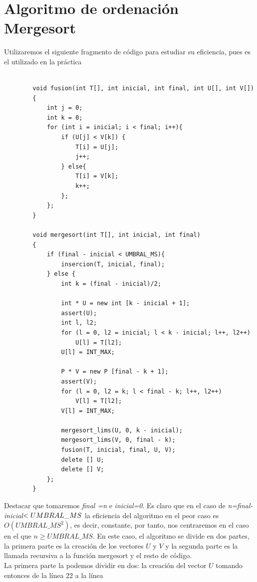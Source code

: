 \documentclass[11pt,openany]{book}
\begin{document}
        \section*{Algoritmo de ordenación Mergesort}
        Utilizaremos el siguiente fragmento de código para estudiar su eficiencia, pues es el utilizado en la práctica
        \begin{lstlisting}
  
        void fusion(int T[], int inicial, int final, int U[], int V[])
        {
            int j = 0;
            int k = 0;
            for (int i = inicial; i < final; i++){
                if (U[j] < V[k]) {
                    T[i] = U[j];
                    j++;
                } else{
                    T[i] = V[k];
                    k++;
                };
            };
        }

        void mergesort(int T[], int inicial, int final)
        {
            if (final - inicial < UMBRAL_MS){
                insercion(T, inicial, final);
            } else {
                int k = (final - inicial)/2;

                int * U = new int [k - inicial + 1];
                assert(U);
                int l, l2;
                for (l = 0, l2 = inicial; l < k - inicial; l++, l2++)
                    U[l] = T[l2];
                U[l] = INT_MAX;

                P * V = new P [final - k + 1];
                assert(V);
                for (l = 0, l2 = k; l < final - k; l++, l2++)
                    V[l] = T[l2];
                V[l] = INT_MAX;

                mergesort_lims(U, 0, k - inicial);
                mergesort_lims(V, 0, final - k);
                fusion(T, inicial, final, U, V);
                delete [] U;
                delete [] V;
            };
        }
        \end{lstlisting}
        Destacar que tomaremos \textit{final =n} e \textit{inicial=0}. Es claro que en el caso de \textit{n=final-inicial}$<\nobreak UMBRAL\_MS$ 
        la eficiencia del algoritmo en el peor caso es $O(UMBRAL\_MS^2)$, es decir, constante, por tanto, nos centraremos en el caso en el que $n\geq UMBRAL\_MS$.
        En este caso, el algoritmo se divide en dos partes, la primera parte es la creación de los vectores $U$ y $V$ y la segunda parte es la
        llamada recursiva a la función mergesort y el resto de código. \\
        La primera parte la podemos dividir en dos: la creación del vector $U$ tomando entonces de la línea 22 a la línea
\end{document}
